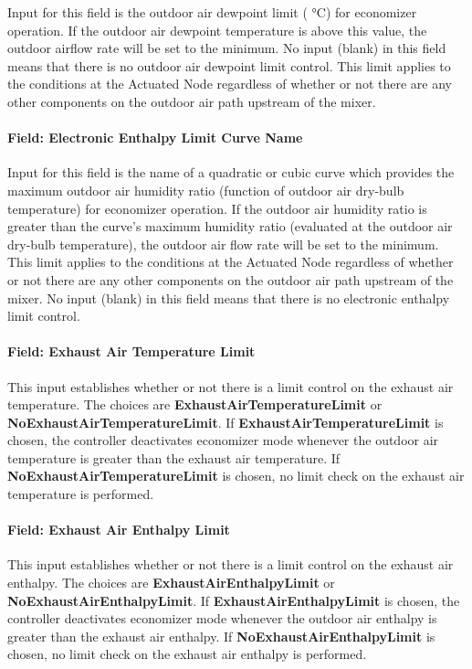 Input for this field is the outdoor air dewpoint limit ( °C) for economizer operation. If the outdoor air dewpoint temperature is above this value, the outdoor airflow rate will be set to the minimum. No input (blank) in this field means that there is no outdoor air dewpoint limit control. This limit applies to the conditions at the Actuated Node regardless of whether or not there are any other components on the outdoor air path upstream of the mixer.

\paragraph{Field: Electronic Enthalpy Limit Curve Name}\label{field-electronic-enthalpy-limit-curve-name-1}

Input for this field is the name of a quadratic or cubic curve which provides the maximum outdoor air humidity ratio (function of outdoor air dry-bulb temperature) for economizer operation. If the outdoor air humidity ratio is greater than the curve's maximum humidity ratio (evaluated at the outdoor air dry-bulb temperature), the outdoor air flow rate will be set to the minimum. This limit applies to the conditions at the Actuated Node regardless of whether or not there are any other components on the outdoor air path upstream of the mixer. No input (blank) in this field means that there is no electronic enthalpy limit control.

\paragraph{Field: Exhaust Air Temperature Limit}\label{field-exhaust-air-temperature-limit}

This input establishes whether or not there is a limit control on the exhaust air temperature. The choices are \textbf{ExhaustAirTemperatureLimit} or \textbf{NoExhaustAirTemperatureLimit}. If \textbf{ExhaustAirTemperatureLimit} is chosen, the controller deactivates economizer mode whenever the outdoor air temperature is greater than the exhaust air temperature. If \textbf{NoExhaustAirTemperatureLimit} is chosen, no limit check on the exhaust air temperature is performed.

\paragraph{Field: Exhaust Air Enthalpy Limit}\label{field-exhaust-air-enthalpy-limit}

This input establishes whether or not there is a limit control on the exhaust air enthalpy. The choices are \textbf{ExhaustAirEnthalpyLimit} or \textbf{NoExhaustAirEnthalpyLimit}. If \textbf{ExhaustAirEnthalpyLimit} is chosen, the controller deactivates economizer mode whenever the outdoor air enthalpy is greater than the exhaust air enthalpy. If \textbf{NoExhaustAirEnthalpyLimit} is chosen, no limit check on the exhaust air enthalpy is performed.

